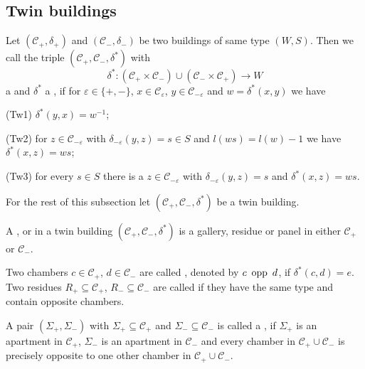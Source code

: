 \subsection{Twin buildings}

\begin{defi}
	Let $(\mathcal{C}_+, \delta_+)$ and $(\mathcal{C}_-, \delta_-)$ be two buildings of same type $(W,S)$. Then we call the triple $(\mathcal{C}_+,\mathcal{C}_-,\delta^*)$ with
	$$ \delta^* : (\mathcal{C}_+ \times \mathcal{C}_-) \cup (\mathcal{C}_- \times \mathcal{C}_+) \to W $$
	a  and $\delta^*$ a , if for $\varepsilon \in \{+,-\}$, $x \in \mathcal{C}_\varepsilon$, $y \in \mathcal{C}_{-\varepsilon}$ and $w = \delta^*(x,y)$ we have
	\begin{axioms}
		\item[(Tw1)] $\delta^*(y,x) = w^{-1}$;
		\item[(Tw2)] for $z \in \mathcal{C}_{-\varepsilon}$ with $\delta_{-\varepsilon}(y,z) = s \in S$ and $l(ws) = l(w) - 1$ we have $\delta^*(x,z) = ws$;
		\item[(Tw3)] for every $s \in S$ there is a $z \in \mathcal{C}_{-\varepsilon}$ with $\delta_{-\varepsilon}(y,z) = s$ and $\delta^*(x,z) = ws$.
	\end{axioms}
\end{defi}

	For the rest of this subsection let $(\mathcal{C}_+,\mathcal{C}_-,\delta^*)$ be a twin building.

\begin{defi}
	A ,  or  in a twin building $(\mathcal{C}_+,\mathcal{C}_-,\delta^*)$ is a gallery, residue or panel in either $\mathcal{C}_+$ or $\mathcal{C}_-$.
\end{defi}

\begin{defi}
	Two chambers $c \in \mathcal{C}_+$, $d \in \mathcal{C}_-$ are called , denoted by $c \opp d$, if $\delta^*(c,d) = e$. Two residues $R_+ \subseteq \mathcal{C}_+$, $R_- \subseteq \mathcal{C}_-$ are called  if they have the same type and contain opposite chambers.
\end{defi}

\begin{defi}
	A pair $(\Sigma_+,\Sigma_-)$ with $\Sigma_+ \subseteq \mathcal{C}_+$ and $\Sigma_- \subseteq \mathcal{C}_-$ is called a , if $\Sigma_+$ is an apartment in $\mathcal{C}_+$, $\Sigma_-$ is an apartment in $\mathcal{C}_-$ and every chamber in $\mathcal C_+ \cup \mathcal C_-$ is precisely opposite to one other chamber in $\mathcal C_+ \cup \mathcal C_-$.
\end{defi}

